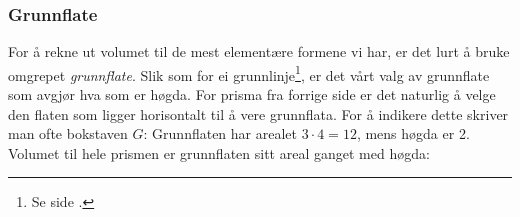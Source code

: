 \subsubsection{Grunnflate}
For å rekne ut volumet til de mest elementære formene vi har, er det lurt å bruke omgrepet \textit{grunnflate}. Slik som for ei grunnlinje\footnote{Se side \pageref{grunnlinje}.}, er det vårt valg av grunnflate som avgjør hva som er høgda. For prisma fra forrige side er det naturlig å velge den flaten som ligger horisontalt til å vere grunnflata. For å indikere dette skriver man ofte bokstaven $ G $:
Grunnflaten har arealet $ 3\cdot4=12 $, mens høgda er 2. Volumet til hele prismen er grunnflaten sitt areal ganget med høgda:


